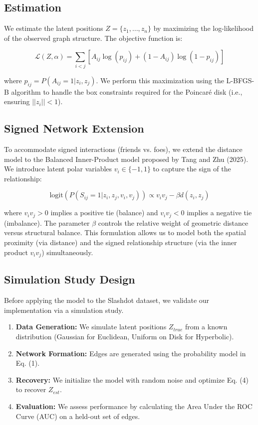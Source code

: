 \subsection{Estimation}
We estimate the latent positions $Z = \{z_1, \dots, z_n\}$ by maximizing the log-likelihood of the observed graph structure. The objective function is:

\begin{equation}
    \mathcal{L}(Z, \alpha) = \sum_{i < j} \left[ A_{ij} \log(p_{ij}) + (1 - A_{ij}) \log(1 - p_{ij}) \right]
\end{equation}

where $p_{ij} = P(A_{ij}=1 | z_i, z_j)$. We perform this maximization using the L-BFGS-B algorithm to handle the box constraints required for the Poincaré disk (i.e., ensuring $||z_i|| < 1$).

\subsection{Signed Network Extension}
To accommodate signed interactions (friends vs. foes), we extend the distance model to the Balanced Inner-Product model proposed by Tang and Zhu (2025). We introduce latent polar variables $v_i \in \{-1, 1\}$ to capture the sign of the relationship:

\begin{equation}
    \text{logit}(P(S_{ij} = 1 | z_i, z_j, v_i, v_j)) \propto v_i v_j - \beta d(z_i, z_j)
\end{equation}

where $v_i v_j > 0$ implies a positive tie (balance) and $v_i v_j < 0$ implies a negative tie (imbalance). The parameter $\beta$ controls the relative weight of geometric distance versus structural balance. This formulation allows us to model both the spatial proximity (via distance) and the signed relationship structure (via the inner product $v_i v_j$) simultaneously.

\subsection{Simulation Study Design}
Before applying the model to the Slashdot dataset, we validate our implementation via a simulation study.
\begin{enumerate}
    \item \textbf{Data Generation:} We simulate latent positions $Z_{true}$ from a known distribution (Gaussian for Euclidean, Uniform on Disk for Hyperbolic).
    \item \textbf{Network Formation:} Edges are generated using the probability model in Eq. (1).
    \item \textbf{Recovery:} We initialize the model with random noise and optimize Eq. (4) to recover $Z_{est}$.
    \item \textbf{Evaluation:} We assess performance by calculating the Area Under the ROC Curve (AUC) on a held-out set of edges.
\end{enumerate}

